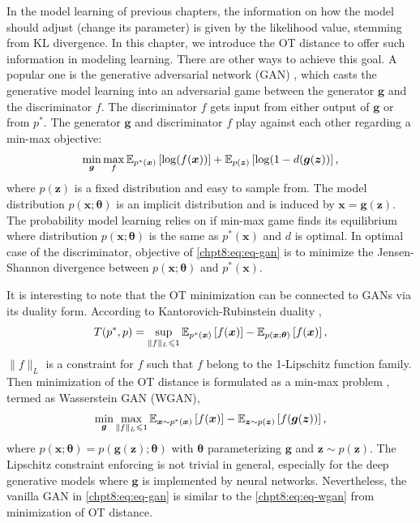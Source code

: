 \begin{remark}
  In the model learning of previous chapters, the information on how the model should adjust (change its parameter) is given by the likelihood value, stemming from KL divergence. In this chapter, we introduce the OT distance to offer such information in modeling learning. There are other ways to achieve this goal. A popular one is the generative adversarial network (GAN) \cite{NIPS2014_5423, 2017arXiv170100160G}, which casts the generative model learning into an adversarial game between the generator $\bm{g}$ and the discriminator $f$.
The {discriminator} $f$ gets input from either output of $\bm{g}$ or from
$p^{\ast}$. The generator $\bm{g}$ and discriminator ${f}$ play against each other
regarding a min-max objective:
\begin{equation}\label{chpt8:eq:eq-gan}
  \min_{\bm{g}} \max_f \mathbb{E}_{p^{\ast}(\bm{x})}\left[ \log(f(\bm{x})) \right] + \mathbb{E}_{p(\bm{z})}\left[ \log(1-d(\bm{g}(\bm{z})) \right],
\end{equation}
where $p(\bm{z})$ is a fixed distribution and easy to sample from. The model distribution $p(\bm{x}; \bm{\theta})$ is an implicit distribution and is induced by $\bm{x} = \bm{g}(\bm{z})$.
The probability model learning relies on if min-max game finds
its equilibrium where distribution $p(\bm{x}; \bm{\theta})$ is the same as $p^{\ast}(\bm{x})$ and
$d$ is optimal. In optimal case of the discriminator, objective of
\eqref{chpt8:eq:eq-gan} is to minimize the Jensen-Shannon divergence between $p(\bm{x}; \bm{\theta})$ and $p^{\ast}(\bm{x})$.
\end{remark}


\begin{remark}\label{chpt8:rmk:wgan}
  It is interesting to note that the OT minimization can be connected to GANs via its duality form. According to Kantorovich-Rubinstein duality \cite{},
  \begin{equation}
     T(p^{\ast},p) = \sup_{\|f\|_{L} \leqslant 1} \mathbb{E}_{p^{\ast}(\bm{x})}\left[ f(\bm{x}) \right] -
  \mathbb{E}_{p(\bm{x};\bm{\theta})}\left[ f(\bm{x}) \right],
\end{equation}
$\|f\|_L$ is a constraint for $f$ such that $f$ belong to the 1-Lipschitz function
family. Then minimization of the OT distance is formulated as a min-max problem \cite{2017arXiv170107875A}, termed as Wasserstein GAN (WGAN),
\begin{equation}\label{chpt8:eq:eq-wgan}
  \min_{\bm{g}} \max_{\|f\|_{L} \leqslant 1} \mathbb{E}_{\bm{x} \sim p^{\ast}(\bm{x})}\left[ f(\bm{x}) \right] -
  \mathbb{E}_{\bm{z}\sim p(\bm{z})}\left[ f(\bm{g}(\bm{z})) \right],
\end{equation}
where $p(\bm{x};\bm{\theta}) = p(\bm{g}(\bm{z}); \bm{\theta})$ with $\bm{\theta}$ parameterizing $\bm{g}$ and $\bm{z}\sim p(\bm{z})$. The  Lipschitz constraint enforcing is not trivial in general, especially for the deep generative models where $\bm{g}$ is implemented by neural networks. Nevertheless, the vanilla GAN in \eqref{chpt8:eq:eq-gan} is similar to the \eqref{chpt8:eq:eq-wgan} from minimization of OT distance.
\end{remark}


